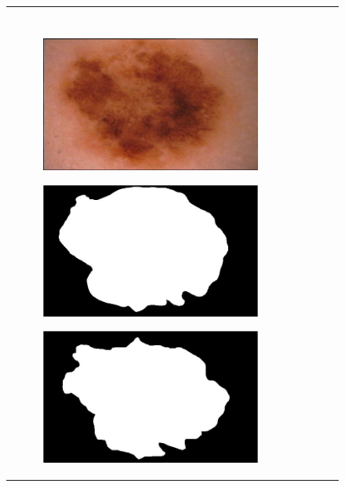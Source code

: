 \documentclass[a4paper, 10pt, conference]{ieeeconf}        %
\begin{document}
\begin{figure}[ht!]
\begin{tabular}{c c c c c}
\begin{subfigure}{0.2\textwidth}
    \end{subfigure} \\ \\
     \begin{subfigure}{0.2\textwidth}
     \includegraphics[scale=0.15]{original07.JPG}
     \end{subfigure}
     \begin{subfigure}{0.2\textwidth}
     \includegraphics[scale=0.2]{expert_1GroundTrue_07.JPG}
     \end{subfigure}
     \begin{subfigure}{0.2\textwidth}
      \includegraphics[scale=0.2]{expert_2GroundTrue_07.JPG}

\end{subfigure}
\end{tabular}
\end{figure}
\end{document}

